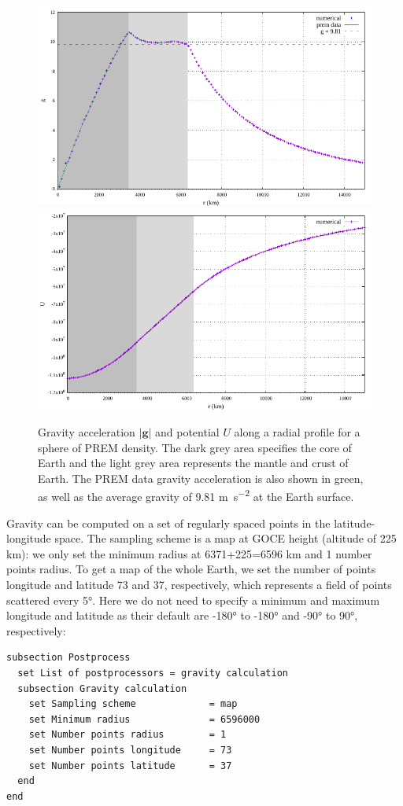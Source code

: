 \begin{figure}[h!]
\centering
\includegraphics[width=0.48\linewidth]{../../benchmarks/gravity_prem/doc/profile_gravity_prem_g.pdf}
\includegraphics[width=0.48\linewidth]{../../benchmarks/gravity_prem/doc/profile_gravity_prem_U.pdf}
\caption{Gravity acceleration $|{\mathbf g}|$ and potential $U$ along a radial profile for a sphere of PREM density. The dark grey area specifies the core of Earth and the light grey area represents the mantle and crust of Earth. The PREM data gravity acceleration is also shown in green, as well as the average gravity of 9.81 \si{\metre\per\square\second} at the Earth surface.}
\label{fig:gravityline2}
\end{figure}

Gravity can be computed on a set of regularly spaced points in the latitude-longitude space. The sampling scheme is a map at GOCE height (altitude of 225 \si{km}): we only set the minimum radius at 6371+225=6596 \si{km} and 1 number points radius. To get a map of the whole Earth, we set the number of points longitude and latitude 73 and 37, respectively, which represents a field of points scattered every 5\si{\degree}. Here we do not need to specify a minimum and maximum longitude and latitude as their default are -180\si{\degree} to -180\si{\degree} and -90\si{\degree} to 90\si{\degree}, respectively:
\begin{lstlisting}
subsection Postprocess
  set List of postprocessors = gravity calculation   
  subsection Gravity calculation
    set Sampling scheme             = map
    set Minimum radius              = 6596000
    set Number points radius        = 1
    set Number points longitude     = 73
    set Number points latitude      = 37
  end
end
\end{lstlisting}

